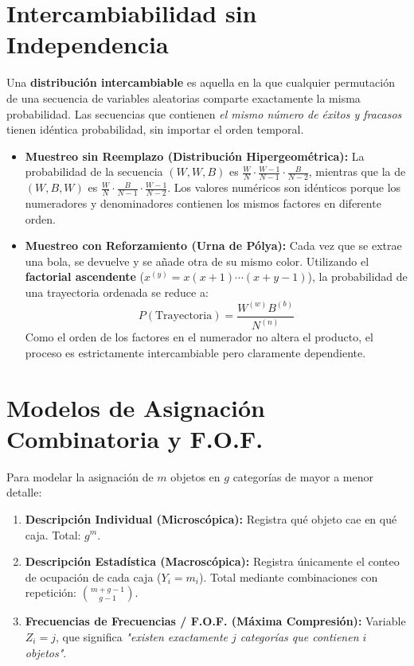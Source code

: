 \documentclass[10pt]{book}
\begin{document}
\section{Intercambiabilidad sin Independencia}

Una \textbf{distribución intercambiable} es aquella en la que cualquier permutación de una secuencia de variables aleatorias comparte exactamente la misma probabilidad. Las secuencias que contienen \textit{el mismo número de éxitos y fracasos} tienen idéntica probabilidad, sin importar el orden temporal.

\begin{itemize}
    \item \textbf{Muestreo sin Reemplazo (Distribución Hipergeométrica):} La probabilidad de la secuencia $(W, W, B)$ es $\frac{W}{N} \cdot \frac{W-1}{N-1} \cdot \frac{B}{N-2}$, mientras que la de $(W, B, W)$ es $\frac{W}{N} \cdot \frac{B}{N-1} \cdot \frac{W-1}{N-2}$. Los valores numéricos son idénticos porque los numeradores y denominadores contienen los mismos factores en diferente orden.
    \item \textbf{Muestreo con Reforzamiento (Urna de Pólya):} Cada vez que se extrae una bola, se devuelve y se añade otra de su mismo color. Utilizando el \textbf{factorial ascendente} ($x^{(y)} = x(x+1)\cdots(x+y-1)$), la probabilidad de una trayectoria ordenada se reduce a:
    \begin{equation}
        P(\text{Trayectoria}) = \frac{W^{(w)} B^{(b)}}{N^{(n)}}
    \end{equation}
    Como el orden de los factores en el numerador no altera el producto, el proceso es estrictamente intercambiable pero claramente dependiente.
\end{itemize}

\section{Modelos de Asignación Combinatoria y F.O.F.}

Para modelar la asignación de $m$ objetos en $g$ categorías de mayor a menor detalle:
\begin{enumerate}
    \item \textbf{Descripción Individual (Microscópica):} Registra qué objeto cae en qué caja. Total: $g^m$.
    \item \textbf{Descripción Estadística (Macroscópica):} Registra únicamente el conteo de ocupación de cada caja ($Y_i = m_i$). Total mediante combinaciones con repetición: $\binom{m+g-1}{g-1}$.
    \item \textbf{Frecuencias de Frecuencias / F.O.F. (Máxima Compresión):} Variable $Z_i = j$, que significa \textit{"existen exactamente $j$ categorías que contienen $i$ objetos"}.
\end{enumerate}
\end{document}
